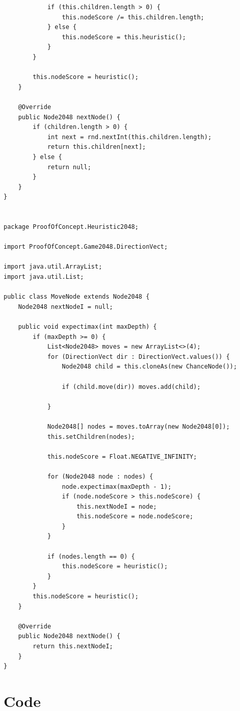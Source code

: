 \documentclass{article}
\begin{document}
\begin{verbatim}
            if (this.children.length > 0) {
                this.nodeScore /= this.children.length;
            } else {
                this.nodeScore = this.heuristic();
            }
        }

        this.nodeScore = heuristic();
    }

    @Override
    public Node2048 nextNode() {
        if (children.length > 0) {
            int next = rnd.nextInt(this.children.length);
            return this.children[next];
        } else {
            return null;
        }
    }
}


package ProofOfConcept.Heuristic2048;

import ProofOfConcept.Game2048.DirectionVect;

import java.util.ArrayList;
import java.util.List;

public class MoveNode extends Node2048 {
    Node2048 nextNodeI = null;

    public void expectimax(int maxDepth) {
        if (maxDepth >= 0) {
            List<Node2048> moves = new ArrayList<>(4);
            for (DirectionVect dir : DirectionVect.values()) {
                Node2048 child = this.cloneAs(new ChanceNode());

                if (child.move(dir)) moves.add(child);

            }

            Node2048[] nodes = moves.toArray(new Node2048[0]);
            this.setChildren(nodes);

            this.nodeScore = Float.NEGATIVE_INFINITY;

            for (Node2048 node : nodes) {
                node.expectimax(maxDepth - 1);
                if (node.nodeScore > this.nodeScore) {
                    this.nextNodeI = node;
                    this.nodeScore = node.nodeScore;
                }
            }

            if (nodes.length == 0) {
                this.nodeScore = heuristic();
            }
        }
        this.nodeScore = heuristic();
    }

    @Override
    public Node2048 nextNode() {
        return this.nextNodeI;
    }
}

\end{verbatim}
\section{Code}
\end{document}
